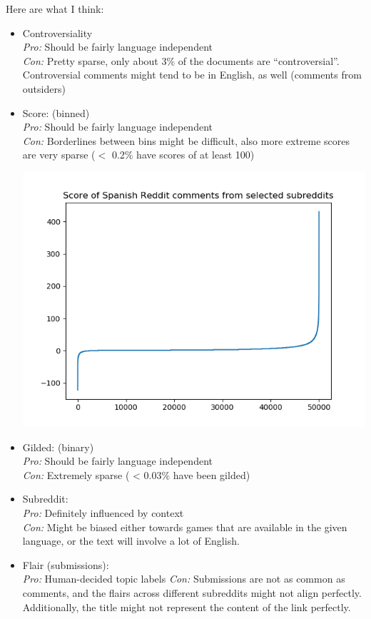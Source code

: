 \documentclass[11pt]{article} %
\begin{document}
Here are what I think:
\begin{itemize}
\item Controversiality \\
\emph{Pro:} Should be fairly language independent \\
\emph{Con:} Pretty sparse, only about 3\% of the documents are ``controversial''. Controversial comments might tend to be in English, as well (comments from outsiders)

\item Score: (binned) \\
\emph{Pro:} Should be fairly language independent \\
\emph{Con:} Borderlines between bins might be difficult, also more extreme scores are very sparse ($<$ 0.2\% have scores of at least 100)

\includegraphics[scale=0.5]{spanish_score.png}

\item Gilded: (binary) \\
\emph{Pro:} Should be fairly language independent \\
\emph{Con:} Extremely sparse ( < 0.03\% have been gilded)

\item Subreddit: \\
\emph{Pro:} Definitely influenced by context \\
\emph{Con:} Might be biased either towards games that are available in the given language, or the text will involve a lot of English.

\item Flair (submissions): \\
\emph{Pro:} Human-decided topic labels
\emph{Con:} Submissions are not as common as comments, and the flairs across different subreddits might not align perfectly. Additionally, the title might not represent the content of the link perfectly.
\end{itemize}
\end{document}
